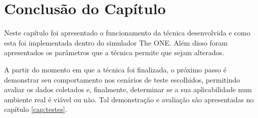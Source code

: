 \section{Conclusão do Capítulo}

Neste capítulo foi apresentado o funcionamento da técnica desenvolvida e como esta foi implementada dentro do simulador The ONE. Além disso foram apresentados os parâmetros que a técnica permite que sejam alterados.

A partir do momento em que a técnica foi finalizada, o próximo passo é demonstrar seu comportamento nos cenários de teste escolhidos, permitindo avaliar os dados coletados e, finalmente, determinar se a sua aplicabilidade num ambiente real é viável ou não. Tal demonstração e avaliação são apresentadas no capítulo \ref{cap:testes}.